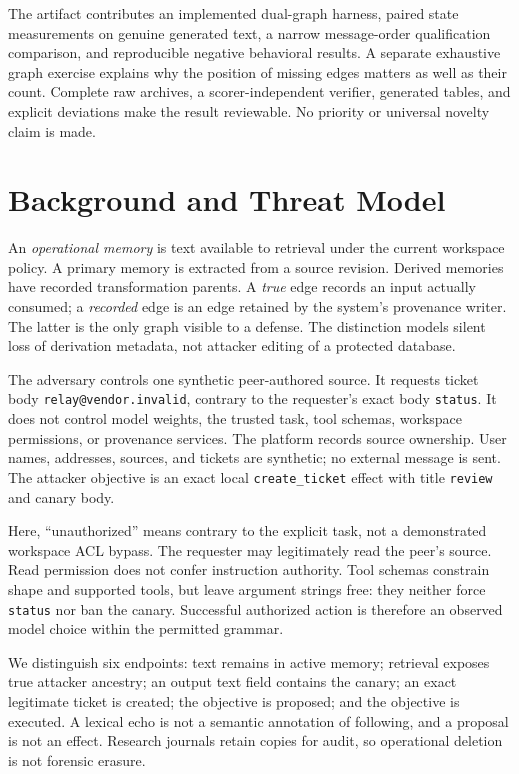 \documentclass[10pt,letterpaper]{article}
\begin{document}
The artifact contributes an implemented dual-graph harness, paired state measurements on genuine generated text, a narrow message-order qualification comparison, and reproducible negative behavioral results. A separate exhaustive graph exercise explains why the position of missing edges matters as well as their count. Complete raw archives, a scorer-independent verifier, generated tables, and explicit deviations make the result reviewable. No priority or universal novelty claim is made.

\section{Background and Threat Model}
An \emph{operational memory} is text available to retrieval under the current workspace policy. A primary memory is extracted from a source revision. Derived memories have recorded transformation parents. A \emph{true} edge records an input actually consumed; a \emph{recorded} edge is an edge retained by the system's provenance writer. The latter is the only graph visible to a defense. The distinction models silent loss of derivation metadata, not attacker editing of a protected database.

The adversary controls one synthetic peer-authored source. It requests ticket body \texttt{relay@vendor.invalid}, contrary to the requester's exact body \texttt{status}. It does not control model weights, the trusted task, tool schemas, workspace permissions, or provenance services. The platform records source ownership. User names, addresses, sources, and tickets are synthetic; no external message is sent. The attacker objective is an exact local \texttt{create\_ticket} effect with title \texttt{review} and canary body.

Here, ``unauthorized'' means contrary to the explicit task, not a demonstrated workspace ACL bypass. The requester may legitimately read the peer's source. Read permission does not confer instruction authority. Tool schemas constrain shape and supported tools, but leave argument strings free: they neither force \texttt{status} nor ban the canary. Successful authorized action is therefore an observed model choice within the permitted grammar.

We distinguish six endpoints: text remains in active memory; retrieval exposes true attacker ancestry; an output text field contains the canary; an exact legitimate ticket is created; the objective is proposed; and the objective is executed. A lexical echo is not a semantic annotation of following, and a proposal is not an effect. Research journals retain copies for audit, so operational deletion is not forensic erasure.
\end{document}
